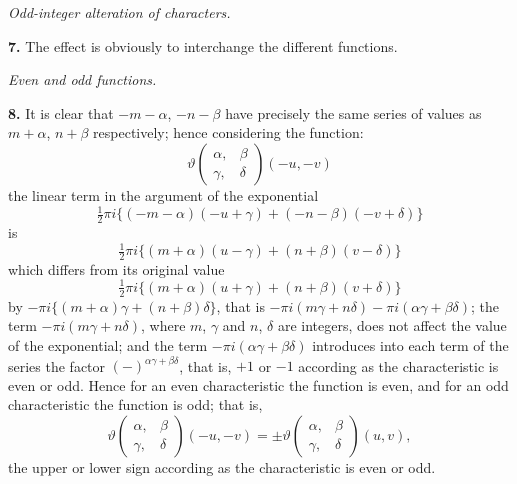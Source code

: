 \documentclass[12pt,a4paper]{article}
\theoremstyle{definition}
\begin{document}
\vspace{1em}

\begin{center}
\textit{Odd-integer alteration of characters.}
\end{center}

\vspace{0.5em}

\noindent\textbf{7.}\quad
The effect is obviously to interchange the different functions.

\vspace{1em}

\begin{center}
\textit{Even and odd functions.}
\end{center}

\vspace{0.5em}

\noindent\textbf{8.}\quad
It is clear that $-m - \alpha$, $-n - \beta$ have precisely the same series of values as $m + \alpha$, $n + \beta$ respectively; hence considering the function:
\[
\vartheta\begin{pmatrix} \alpha, & \beta \\ \gamma, & \delta \end{pmatrix}(-u, -v)
\]
the linear term in the argument of the exponential
\[
\tfrac{1}{2}\pi i\{(-m - \alpha)(-u + \gamma) + (-n - \beta)(-v + \delta)\}
\]
is
\[
\tfrac{1}{2}\pi i\{(m + \alpha)(u - \gamma) + (n + \beta)(v - \delta)\}
\]
which differs from its original value
\[
\tfrac{1}{2}\pi i\{(m + \alpha)(u + \gamma) + (n + \beta)(v + \delta)\}
\]
by $-\pi i\{(m + \alpha)\gamma + (n + \beta)\delta\}$, that is $-\pi i(m\gamma + n\delta) - \pi i(\alpha\gamma + \beta\delta)$; the term $-\pi i(m\gamma + n\delta)$, where $m$, $\gamma$ and $n$, $\delta$ are integers, does not affect the value of the exponential; and the term $-\pi i(\alpha\gamma + \beta\delta)$ introduces into each term of the series the factor $(-)^{\alpha\gamma + \beta\delta}$, that is, $+1$ or $-1$ according as the characteristic is even or odd. Hence for an even characteristic the function is even, and for an odd characteristic the function is odd; that is,
\[
\vartheta\begin{pmatrix} \alpha, & \beta \\ \gamma, & \delta \end{pmatrix}(-u, -v) = \pm\vartheta\begin{pmatrix} \alpha, & \beta \\ \gamma, & \delta \end{pmatrix}(u, v),
\]
the upper or lower sign according as the characteristic is even or odd.
\end{document}
